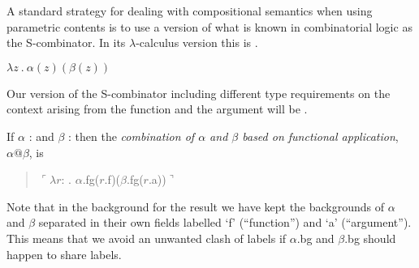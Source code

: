 A standard strategy for dealing with compositional semantics when
using parametric contents is to use a version of what is known in
combinatorial logic as the S-combinator.  In its $\lambda$-calculus
version this is \nexteg{}.
\begin{ex} 
$\lambda z\ .\ \alpha(z)(\beta(z))$ 
\end{ex} 
Our version of the S-combinator including different type requirements
on the context arising from the function and the argument will be
\nexteg{}.
\begin{ex}
If $\alpha$ :  
and $\beta$ : 
                         then the \textit{combination of $\alpha$ and
    $\beta$  based on functional application}, $\alpha\text{@}\beta$, is
\begin{quote}
$\ulcorner\lambda r$: . $\alpha$.fg($r$.f)($\beta$.fg($r$.a))$\urcorner$
\end{quote}
\end{ex}



Note that in the background for the result we have kept the
backgrounds of $\alpha$ and $\beta$
separated in their own fields labelled `f' (``function'') and `a'
(``argument'').%
This means that we avoid an unwanted clash of labels
if $\alpha$.bg and $\beta$.bg should happen to share
labels.

